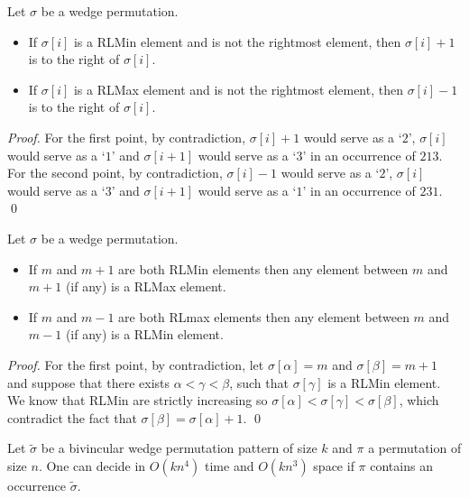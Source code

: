 \documentclass[a4paper]{llncs}
\begin{document}
\begin{lemma}
\label{lemma:after}
Let $\sigma$ be a wedge permutation.
\begin{itemize}
\item If $\sigma[i]$ is a RLMin element and is not the rightmost element, then $\sigma[i]+1$ is to the right of $\sigma[i]$.
\item If $\sigma[i]$ is a RLMax element and is not the rightmost element, then $\sigma[i]-1$ is to the right of $\sigma[i]$.
\end{itemize}
\end{lemma}

\begin{proof}
For the first point,
by contradiction, $\sigma[i]+1$ would serve as a `$2$', $\sigma[i]$ would serve as a `$1$' and $\sigma[i+1]$ would serve as a `$3$' in
an occurrence of $213$.
For the second point,
by contradiction, $\sigma[i]-1$ would serve as a `$2$', $\sigma[i]$ would serve as a `$3$' and $\sigma[i+1]$ would serve as a `$1$' in
an occurrence of $231$.
\qed
\end{proof}

\begin{lemma}
\label{lemma:ascentDescentAscent}
Let $\sigma$ be a wedge permutation.
\begin{itemize}
\item If $m$ and $m+1$ are both RLMin elements
then any element between $m$ and $m+1$ (if any)
is a RLMax element.
\item If $m$ and $m-1$ are both RLmax elements
then any element between $m$ and $m-1$ (if any)
is a RLMin element.
\end{itemize}

\end{lemma}


\begin{proof} %
For the first point, by contradiction,
let $\sigma[\alpha]=m$ and $\sigma[\beta]=m+1$
and suppose that there exists $\alpha < \gamma < \beta$,
such that $\sigma[\gamma]$ is a RLMin element.
We know that RLMin are strictly increasing so
$\sigma[\alpha] <  \sigma[\gamma] < \sigma[\beta]$,
which contradict the fact that $\sigma[\beta]=\sigma[\alpha]+1$.
\qed
\end{proof}

\begin{proposition}
\label{Proposition:bivincular pattern}
Let $\widetilde{\sigma}$ be a bivincular wedge permutation pattern of size $k$
and $\pi$ a permutation of size $n$.
One can decide in $O(kn^4)$ time
and $O(kn^3)$ space if $\pi$ contains an occurrence $\widetilde{\sigma}$.
\end{proposition}
\end{document}
